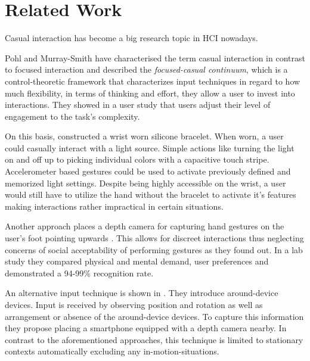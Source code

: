 \chapter{Related Work}\label{ch:relatedwork}

Casual interaction has become a big research topic in \ac{HCI} nowadays.

Pohl and Murray-Smith \cite{pohl2013focused} have characterised the term casual interaction in contrast to focused interaction and described the \textit{focused-casual continuum}, which is a control-theoretic framework that characterizes input techniques in regard to how much flexibility, in terms of thinking and effort, they allow a user to invest into interactions. They showed in a user study that users adjust their level of engagement to the task's complexity.

On this basis, \cite{Busse2014Thesis} constructed a wrist worn silicone bracelet. When worn, a user could casually interact with a light source. Simple actions like turning the light on and off up to picking individual colors with a capacitive touch stripe. Accelerometer based gestures could be used to activate previously defined and memorized light settings. Despite being highly accessible on the wrist, a user would still have to utilize the hand without the bracelet to activate it's features making interactions rather impractical in certain situations.

Another approach places a depth camera for capturing hand gestures on the user's foot pointing upwards \cite{bailly2012shoesense}. This allows for discreet interactions thus neglecting concerns of social acceptability of performing gestures as they found out. In a lab study they compared physical and mental demand, user preferences and demonstrated a 94-99\% recognition rate.

An alternative input technique is shown in \cite{pohl2014around}. They introduce around-device devices. Input is received by observing position and rotation as well as arrangement or absence of the around-device devices. To capture this information they propose placing a smartphone equipped with a depth camera nearby.  In contrast to the aforementioned approaches, this technique is limited to stationary contexts automatically excluding any in-motion-situations.

